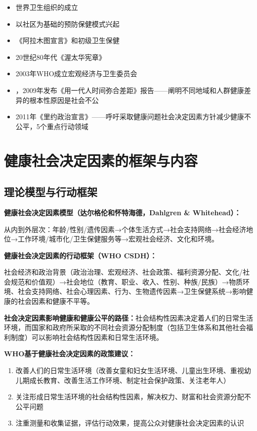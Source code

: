 \begin{defbox}
\begin{itemize}[leftmargin=*]
    \item 世界卫生组织的成立
    \item 以社区为基础的预防保健模式兴起
    \item 《阿拉木图宣言》和初级卫生保健
    \item 20世纪80年代《渥太华宪章》
    \item 2003年WHO成立宏观经济与卫生委员会
    \item {}，2009年发布《用一代人时间弥合差距》报告——阐明不同地域和人群健康差异的根本性原因是社会不公
    \item 2011年《里约政治宣言》——呼吁采取健康问题社会决定因素方针减少健康不公平，5个重点行动领域
\end{itemize}
\end{defbox}

\section{健康社会决定因素的框架与内容}

\subsection{理论模型与行动框架}

\begin{keybox}
\textbf{健康社会决定因素模型（达尔格伦和怀特海德，Dahlgren \& Whitehead）：}

从内到外层次：年龄/性别/遗传因素→个体生活方式→社会支持网络→社会经济地位→工作环境/城市化/卫生保健服务等→宏观社会经济、文化和环境。

\textbf{健康社会决定因素的行动框架（WHO CSDH）：}

社会经济和政治背景（政治治理、宏观经济、社会政策、福利资源分配、文化/社会规范和价值观）→社会地位（教育、职业、收入、性别、种族/民族）→物质环境、社会支持网络、社会心理因素、行为、生物遗传因素→卫生保健系统→影响健康的社会因素和健康不平等。

\textbf{社会决定因素影响健康和健康公平的路径：}社会结构性因素决定着人们的日常生活环境，而国家和政府所采取的不同社会资源分配制度（包括卫生体系和其他社会福利制度）可以影响社会结构性因素和日常生活环境。

\textbf{WHO基于健康社会决定因素的政策建议：}
\begin{enumerate}[leftmargin=*]
    \item 改善人们的日常生活环境（改善女童和妇女生活环境、儿童出生环境、重视幼儿期成长教育、改善生活工作环境、制定社会保护政策、关注老年人）
    \item 关注形成日常生活环境的社会结构性因素，解决权力、财富和社会资源分配不公平问题
    \item 注重测量和收集证据，评估行动效果，提高公众对健康社会决定因素的认识
\end{enumerate}
\end{keybox}


